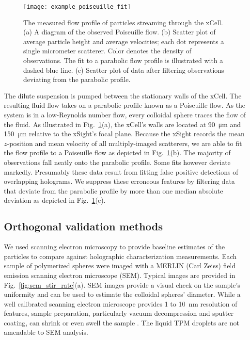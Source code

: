 \begin{figure}
    \centering
    \texttt{[image: example\_poiseuille\_fit]}
    \caption{The measured flow profile of particles streaming through the xCell.
      (a)  A diagram of the observed Poiseuille flow.\protect\footnotemark 
      (b) Scatter plot of average particle height and average velocities; each
      dot represents a single micrometer scatterer. Color denotes the density of
      observations. The fit to a parabolic flow profile is illustrated with a dashed
      blue line. (c) Scatter plot of data after filtering observations deviating
      from the parabolic profile.}
    \label{fig:flow_prof}
\end{figure}

The dilute suspension is pumped between the stationary walls of the xCell.
The resulting fluid flow takes on a parabolic profile known as a Poiseuille flow.
As the system is in a low-Reynolds number flow, every colloidal sphere traces
the flow of the fluid.
As illustrated in Fig.~\ref{fig:flow_prof}(a), the xCell's walls are located
at \SI{90}{\um} and \SI{150}{\um} relative to the xSight's focal plane.
Because the xSight records the mean $z$-position and mean 
velocity of all multiply-imaged scatterers, we are able to fit the flow
profile to a Poiseuille flow as depicted in Fig.~\ref{fig:flow_prof}(b).
The majority of observations fall neatly onto the parabolic profile. 
Some fits however deviate markedly. Presumably these data result from fitting
false positive detections of overlapping holograms.
We suppress these erroneous features by filtering data that deviate from
the parabolic profile by more than one median absolute deviation
as depicted in Fig.~\ref{fig:flow_prof}(c).

\subsection{Orthogonal validation methods}

We used scanning electron microscopy to provide baseline estimates of the
particles to compare against holographic characterization measurements.
Each sample of polymerized spheres were imaged with a MERLIN (Carl Zeiss) field
emission scanning electron microscope (SEM).
Typical images are provided in Fig.~\ref{fig:sem_stir_rate}(a).
SEM images provide a visual check on the sample's uniformity
and can be used to estimate the colloidal spheres' diameter. While a well calibrated scanning
electron microscope provides \num{1} to \SI{10}{\nm} resolution of features, sample
preparation, particularly vacuum decompression and sputter coating, can shrink or
even swell the sample \cite{yamada85,jung02}. The liquid TPM droplets
are not amendable to SEM analysis.

